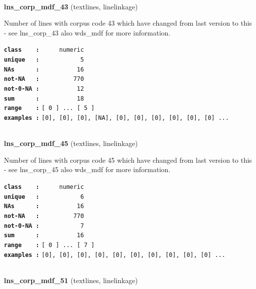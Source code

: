 \documentclass[]{article}
\begin{document}
~

\textbf{lns\_corp\_mdf\_43} (textlines, linelinkage)

Number of lines with corpus code 43 which have changed from last version
to this - see lns\_corp\_43 also wds\_mdf for more information.

\textbf{\texttt{class\ \ \ \ :}} \texttt{~~~~~numeric}\\
\textbf{\texttt{unique\ \ \ :}} \texttt{~~~~~~~~~~~5}\\
\textbf{\texttt{NAs\ \ \ \ \ \ :}} \texttt{~~~~~~~~~~16}\\
\textbf{\texttt{not-NA\ \ \ :}} \texttt{~~~~~~~~~770}\\
\textbf{\texttt{not-0-NA\ :}} \texttt{~~~~~~~~~~12}\\
\textbf{\texttt{sum\ \ \ \ \ \ :}} \texttt{~~~~~~~~~~18}\\
\textbf{\texttt{range\ \ \ \ :}}
\texttt{{[}\ 0\ {]}\ ...\ {[}\ 5\ {]}}\\
\textbf{\texttt{examples\ :}}
\texttt{{[}0{]},\ {[}0{]},\ {[}0{]},\ {[}NA{]},\ {[}0{]},\ {[}0{]},\ {[}0{]},\ {[}0{]},\ {[}0{]},\ {[}0{]}\ ...}\\

~

\textbf{lns\_corp\_mdf\_45} (textlines, linelinkage)

Number of lines with corpus code 45 which have changed from last version
to this - see lns\_corp\_45 also wds\_mdf for more information.

\textbf{\texttt{class\ \ \ \ :}} \texttt{~~~~~numeric}\\
\textbf{\texttt{unique\ \ \ :}} \texttt{~~~~~~~~~~~6}\\
\textbf{\texttt{NAs\ \ \ \ \ \ :}} \texttt{~~~~~~~~~~16}\\
\textbf{\texttt{not-NA\ \ \ :}} \texttt{~~~~~~~~~770}\\
\textbf{\texttt{not-0-NA\ :}} \texttt{~~~~~~~~~~~7}\\
\textbf{\texttt{sum\ \ \ \ \ \ :}} \texttt{~~~~~~~~~~16}\\
\textbf{\texttt{range\ \ \ \ :}}
\texttt{{[}\ 0\ {]}\ ...\ {[}\ 7\ {]}}\\
\textbf{\texttt{examples\ :}}
\texttt{{[}0{]},\ {[}0{]},\ {[}0{]},\ {[}0{]},\ {[}0{]},\ {[}0{]},\ {[}0{]},\ {[}0{]},\ {[}0{]},\ {[}0{]}\ ...}\\

~

\textbf{lns\_corp\_mdf\_51} (textlines, linelinkage)
\end{document}
